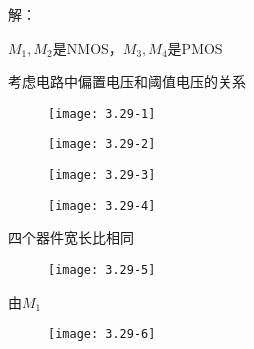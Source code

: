 


解：

$M_1,M_2$是NMOS，$M_3,M_4$是PMOS

考虑电路中偏置电压和阈值电压的关系

		\begin{figure}[H] %
	\begin{minipage}{\linewidth}
		\texttt{[image: 3.29-1]}
	\end{minipage}
\end{figure}

		\begin{figure}[H] %
	\begin{minipage}{\linewidth}
		\texttt{[image: 3.29-2]}
	\end{minipage}
\end{figure}

		\begin{figure}[H] %
	\begin{minipage}{\linewidth}
		\texttt{[image: 3.29-3]}
	\end{minipage}
\end{figure}

		\begin{figure}[H] %
	\begin{minipage}{\linewidth}
		\texttt{[image: 3.29-4]}
	\end{minipage}
\end{figure}





四个器件宽长比相同

		\begin{figure}[H] %
	\begin{minipage}{\linewidth}
		\texttt{[image: 3.29-5]}
	\end{minipage}
\end{figure}




由$M_1$

		\begin{figure}[H] %
	\begin{minipage}{\linewidth}
		\texttt{[image: 3.29-6]}
	\end{minipage}
\end{figure}

